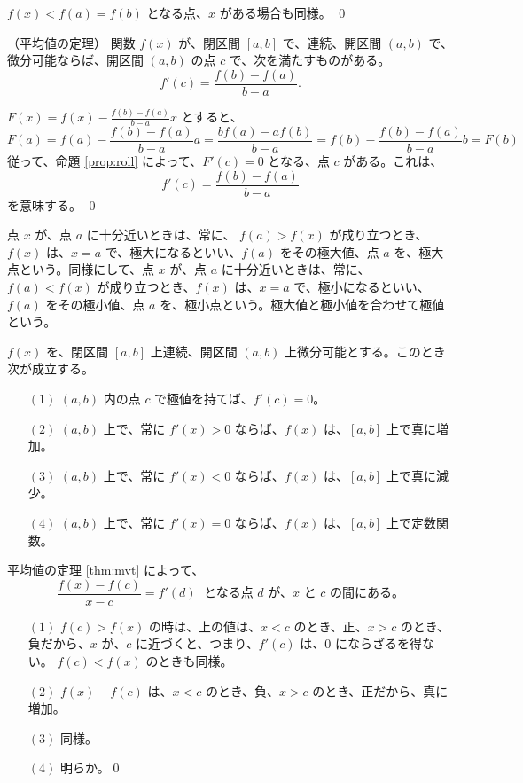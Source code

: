 $f(x) < f(a) = f(b)$ となる点、$x$ がある場合も同様。
\qed

\begin{thm} （平均値の定理）\quad  \label{thm:mvt}
関数 $f(x)$ が、閉区間 $[a,b]$ で、連続、開区間 $(a,b)$ で、微分可能ならば、開区間 $(a,b)$ の点 $c$ で、次を満たすものがある。
$$f'(c) = \frac{f(b) - f(a)}{b-a}.$$
\end{thm}
\proof
$F(x) = f(x) - {\displaystyle \frac{f(b) - f(a)}{b-a}}x$ とすると、
$$F(a) = f(a) - \frac{f(b) - f(a)}{b-a}a = \frac{bf(a) - af(b)}{b-a} = 
f(b) - \frac{f(b) - f(a)}{b-a}b = F(b)$$
従って、命題 \ref{prop:roll} によって、$F'(c) = 0$  となる、点 $c$ がある。これは、
$$f'(c) = \frac{f(b) - f(a)}{b-a}$$
を意味する。
\qed

\newpage{}
\begin{definition}
点 $x$ が、点 $a$ に十分近いときは、常に、
$f(a) > f(x)$ が成り立つとき、$f(x)$ は、$x = a$ で、極大になるといい、$f(a)$ をその極大値、点 $a$ を、極大点という。同様にして、点 $x$ が、点 $a$ に十分近いときは、常に、
$f(a) < f(x)$ が成り立つとき、$f(x)$ は、$x = a$ で、極小になるといい、$f(a)$ をその極小値、点 $a$ を、極小点という。極大値と極小値を合わせて極値という。
\end{definition}

\begin{prop} \label{prop:1stderiv-test}
$f(x)$ を、閉区間 $[a,b]$ 上連続、開区間 $(a,b)$  上微分可能とする。このとき次が成立する。
\begin{itemize}
\item[$(1)$] $(a,b)$ 内の点 $c$ で極値を持てば、$f'(c) = 0$。
\item[$(2)$] $(a,b)$ 上で、常に $f'(x)>0$ ならば、$f(x)$  は、$[a,b]$ 上で真に増加。
\item[$(3)$] $(a,b)$ 上で、常に $f'(x)<0$ ならば、$f(x)$  は、$[a,b]$ 上で真に減少。
\item[$(4)$] $(a,b)$ 上で、常に $f'(x)=0$ ならば、$f(x)$  は、$[a,b]$ 上で定数関数。
\end{itemize}
\end{prop}
\proof
平均値の定理 \ref{thm:mvt} によって、
$$\frac{f(x) - f(c)}{x-c} = f'(d) \;\mbox{ となる点 } d \mbox{ が、$x$ と $c$ の間にある。}$$
\begin{itemize}
\item[$(1)$] $f(c) > f(x)$ の時は、上の値は、$x < c$ のとき、正、$x>c$ のとき、負だから、$x$ が、$c$ に近づくと、つまり、$f'(c)$ は、$0$ にならざるを得ない。
$f(c) < f(x)$ のときも同様。
\item[$(2)$] $f(x) - f(c)$ は、$x<c$ のとき、負、$x>c$ のとき、正だから、真に増加。
\item[$(3)$] 同様。
\item[$(4)$] 明らか。\qed
\end{itemize}

